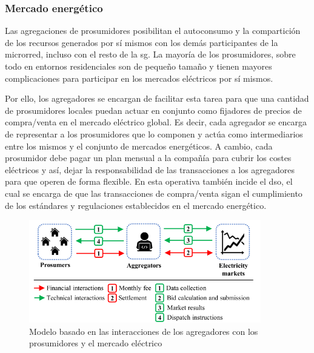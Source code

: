 \subsubsection{Mercado energético}

Las agregaciones de prosumidores posibilitan el autoconsumo y la compartición de los recursos generados por sí mismos con los demás participantes de la microrred, incluso con el resto de la \gls{sg}. La mayoría de los prosumidores, sobre todo en entornos residenciales son de pequeño tamaño y tienen mayores complicaciones para participar en los mercados eléctricos por sí mismos. 

\vspace{3mm}

Por ello, los agregadores \cite{bidding} \cite{transactive} se encargan de facilitar esta tarea para que una cantidad de prosumidores locales puedan actuar en conjunto como fijadores de precios de compra/venta en el mercado eléctrico global. Es decir, cada agregador se encarga de representar a los prosumidores que lo componen y actúa como intermediarios entre los mismos y el conjunto de mercados energéticos. A cambio, cada prosumidor debe pagar un plan mensual a la compañía para cubrir los costes eléctricos y así, dejar la responsabilidad de las transacciones a los agregadores para que operen de forma flexible. En esta operativa también incide el \gls{dso}, el cual se encarga de que las transacciones de compra/venta sigan el cumplimiento de los estándares y regulaciones establecidos en el mercado energético. 

\vspace{3mm}

\begin{figure}[h!]
  \centering
  \includegraphics[width=0.9\textwidth]{img/teoria/market.png}
  \caption{Modelo basado en las interacciones de los agregadores con los prosumidores y el mercado eléctrico \cite{business}}
  \label{fig:market}
\end{figure}

